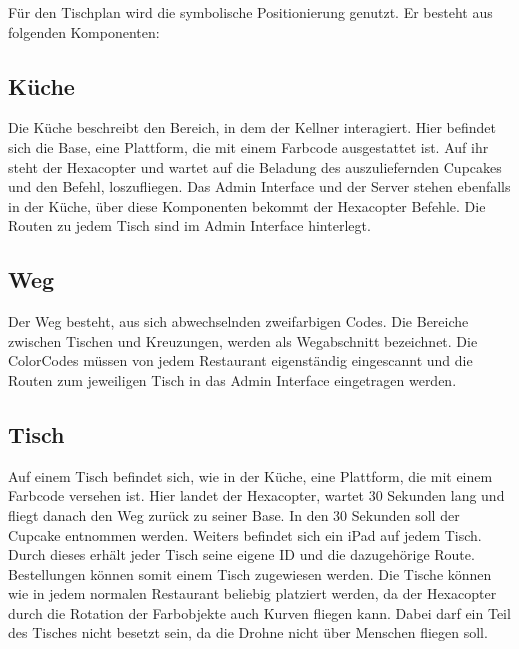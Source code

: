   Für den Tischplan wird die symbolische Positionierung genutzt. Er besteht aus folgenden Komponenten:

  \subsection*{Küche}
  Die Küche beschreibt den Bereich, in dem der Kellner interagiert. Hier befindet sich die Base, eine Plattform, die mit einem Farbcode ausgestattet ist. Auf ihr steht der Hexacopter und wartet auf die Beladung des auszuliefernden Cupcakes und den Befehl, loszufliegen.
  Das Admin Interface und der Server stehen ebenfalls in der Küche, über diese Komponenten bekommt der Hexacopter Befehle. Die Routen zu jedem Tisch sind im Admin Interface hinterlegt.

  \subsection*{Weg}
  Der Weg besteht, aus sich abwechselnden zweifarbigen Codes. Die Bereiche zwischen Tischen und Kreuzungen, werden als Wegabschnitt bezeichnet. Die ColorCodes müssen von jedem Restaurant eigenständig eingescannt und die Routen zum jeweiligen Tisch in das Admin Interface eingetragen werden.

  \subsection*{Tisch}
  Auf einem Tisch befindet sich, wie in der Küche, eine Plattform, die mit einem Farbcode versehen ist. Hier landet der Hexacopter, wartet 30 Sekunden lang und fliegt danach den Weg zurück zu seiner Base. In den 30 Sekunden soll der Cupcake entnommen werden. Weiters befindet sich ein iPad auf jedem Tisch. Durch dieses erhält jeder Tisch seine eigene ID und die dazugehörige Route. Bestellungen können somit einem Tisch zugewiesen werden.
  Die Tische können wie in jedem normalen Restaurant beliebig platziert werden, da der Hexacopter durch die Rotation der Farbobjekte auch Kurven fliegen kann. Dabei darf ein Teil des Tisches nicht besetzt sein, da die Drohne nicht über Menschen fliegen soll.


